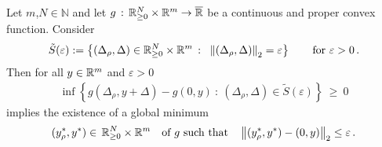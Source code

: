 \begin{lemma}
  \label{lem:link_conv_p}
  Let $m$,$N\in\mathbb{N}$ and let 
  $
  g \,:\, \mathbb{R}^N_{\ge 0}\times\mathbb{R}^m \to \overline{\mathbb{R}}
  $ 
  be a continuous and proper convex function.
  Consider 
  \begin{gather*}
    \tilde{S}(\varepsilon)
    :=
    \left\{ 
      (\Delta_\rho,\Delta)
      \in
      \R^N_{\ge 0}\times\R^m
      \ 
      \colon
      \ 
      \norm{
      (\Delta_\rho,\Delta)
      }_2
      =
      \varepsilon
    \right\}
    \qquad
    \text{for}
    \ 
    \varepsilon>0
    \,.
  \end{gather*}
Then 
  for all $y \in \mathbb{R}^m$ and $\varepsilon>0$ 
    \begin{gather}
      \label{696}
      \inf 
      \left\{ 
        g(\Delta_\rho,y+\Delta)
        -
        g(0,y)
      \ 
        \colon
      \ 
      (\Delta_\rho,\Delta)
      \in
    \tilde{S}(\varepsilon)
      \right\}
      \ 
      \ge
      \ 
      0
    \end{gather}
    implies
    the existence of  
    a global minimum
    \begin{gather*}
    (y^*_\rho,y^*)
    \in \,\mathbb{R}^N_{\ge 0}\times\mathbb{R}^m
    \quad
    \text{of $g$ such that}\quad
      \left\lVert
    (y^*_\rho,y^*)
      - (0,y)\right\rVert_2 \le \varepsilon
      \,.
    \end{gather*}
\end{lemma}
